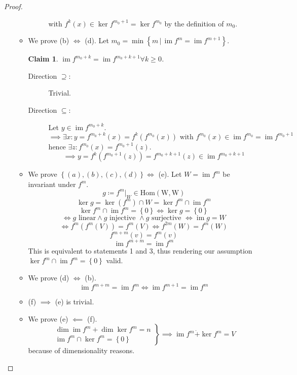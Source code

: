 \documentclass[a4paper]{article}
\numberwithin{lecref}{section}
\newtheorem*{claim}{Claim}
\newcommand{\set}[1]{\left\{#1\right\}}
\newcommand{\setdef}[2]{\left\{\left.#1\,\right|\,#2\right\}}
\DeclareMathOperator{\im}{im}
\begin{document}
\begin{proof}
\begin{enumerate}
\begin{itemize}
\begin{description}
              with $f^k(x) \in \ker{f^{m_0 + 1}} = \ker{f^{m_0}}$ by the definition of $m_0$.
          \end{description}
        \item
          We prove (b) $\iff$ (d).
          Let $m_0 = \min\setdef{m}{\im{f^m} = \im{f^{m+1}}}$.
          \begin{claim} $\im{f^{m_0 + k}} = \im{f^{m_0 + k + 1}} \forall k \geq 0$. \end{claim}
          \begin{description}
            \item[Direction $\supseteq$:] Trivial.
            \item[Direction $\subseteq$:]
              Let $y \in \im{f^{m_0 + k}}$.
              \[ \implies \exists x: y = f^{m_0 + k}(x) = f^k(f^{m_0}(x)) \text{ with } f^{m_0}(x) \in \im{f^{m_0} = \im{f^{m_0 + 1}}} \]
              hence $\exists z: f^{m_0}(x) = f^{m_0 + 1}(z)$.
              \[ \implies y = f^k(f^{m_0 + 1}(z)) = f^{m_0 + k + 1}(z) \in \im{f^{m_0 + k + 1}} \]
          \end{description}
        \item We prove $\set{(a), (b), (c), (d)} \iff$ (e).
          Let $W = \im{f^m}$ be invariant under $f^m$.
          \[ g \coloneqq f^m|_W \in \operatorname{Hom(W, W)} \]
          \[ \ker{g} = \ker(f^m) \cap W = \ker{f^m} \cap \im{f^m} \]
          \[ \ker{f^m} \cap \im{f^m} = \set{0} \iff \ker{g} = \set{0} \]
          \[ \iff g \text{ linear} \land g \text{ injective } \land g \text{ surjective } \iff \im{g} = W \]
          \[ \iff f^m(f^m(V)) = f^m(V) \iff f^{2m}(W) = f^m(W) \]
          \[ f^{m+m}(v) = f^m(v) \]
          \[ \im{f^{m+m}} = \im{f^m} \]
          This is equivalent to statements 1 and 3, thus rendering our assumption $\ker{f^m} \cap \im{f^m} = \set{0}$ valid.
        \item We prove (d) $\iff$ (b).
          \[ \im{f^{m+m}} = \im{f^m} \iff \im{f^{m+1}} = \im{f^m} \]
        \item (f) $\implies$ (e) is trivial.
        \item We prove (e) $\impliedby$ (f).
          \[
            \left.\begin{array}{c}
              \dim\im{f^m} + \dim\ker{f^m} = n \\
              \im{f^m} \cap \ker{f^m} = \set{0}
            \end{array}\right\}
            \implies \im{f^m} \dot{+} \ker{f^m} = V
          \]
          because of dimensionality reasons.
      \end{itemize}
  \end{enumerate}
\end{proof}
\end{document}
